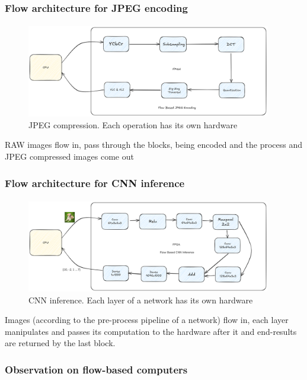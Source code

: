 \documentclass{beamer}
\begin{document}
{\begin{frame}[fragile]
  \frametitle{Flow architecture for JPEG encoding}
  \framesubtitle{}
  \begin{figure}
    \centering
    \includegraphics[width=0.95\textwidth]{flowjpeg.png}
    \caption{JPEG compression. Each operation has its own hardware}
    \label{}
  \end{figure}

  RAW images flow in, pass through the blocks, being encoded
  and the process and JPEG compressed images come out
\end{frame}

\begin{frame}[fragile]
  \frametitle{Flow architecture for CNN inference}
  \framesubtitle{}
  \begin{figure}
    \centering
    \includegraphics[width=0.95\textwidth]{flowcnn.png}
    \caption{CNN inference. Each layer of a network has its own hardware}
    \label{}
  \end{figure}

  Images (according to the pre-process pipeline of a network) flow
  in, each layer manipulates and passes its computation to the
  hardware after it and end-results are returned by the last
  block.
\end{frame}

\begin{frame}[fragile]
  \frametitle{Observation on flow-based computers}
  \framesubtitle{}
  \begin{enumerate}
      

\end{enumerate}
\end{frame}}
\end{document}
